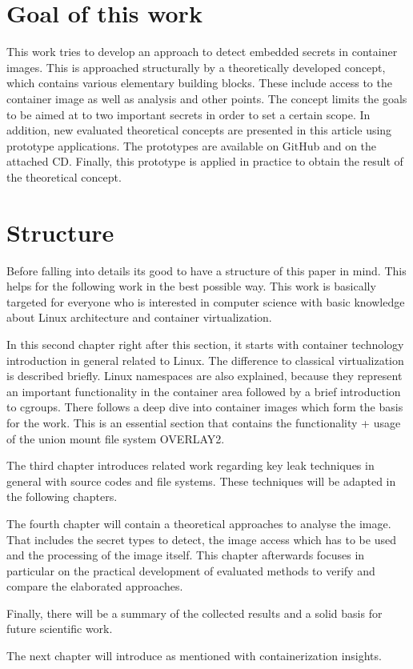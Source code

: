 \section{Goal of this work}
\label{sec:intro:goal}
This work tries to develop an approach to detect embedded secrets in container images. This is approached structurally by a theoretically developed concept, which contains various elementary building blocks. These include access to the container image as well as analysis and other points. The concept limits the goals to be aimed at to two important secrets in order to set a certain scope.
In addition, new evaluated theoretical concepts are presented in this article using prototype applications. The prototypes are available on GitHub and on the attached CD.
Finally, this prototype is applied in practice to obtain the result of the theoretical concept.
%
%
\section{Structure}
\label{sec:intro:structure}
Before falling into details its good to have a structure of this paper in mind. This helps for the following work in the best possible way.
This work is basically targeted for everyone who is interested in computer science with basic knowledge about Linux architecture and container virtualization.

In this second chapter right after this section, it starts with container technology introduction in general related to Linux. The difference to classical virtualization is described briefly. Linux namespaces are also explained, because they represent an important functionality in the container area followed by a brief introduction to cgroups.
There follows a deep dive into container images which form the basis for the work. This is an essential section that contains the functionality + usage of the union mount file system OVERLAY2.

The third chapter introduces related work regarding key leak techniques in general with source codes and file systems. These techniques will be adapted in the following chapters.

The fourth chapter will contain a theoretical approaches to analyse the image. That includes the secret types to detect, the image access which has to be used and the processing of the image itself.
This chapter afterwards focuses in particular on the practical development of evaluated methods to verify and compare the elaborated approaches.

Finally, there will be a summary of the collected results and a solid basis for future scientific work.

The next chapter will introduce as mentioned with containerization insights.
